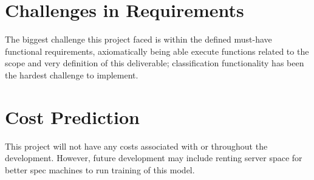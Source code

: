 \section{Challenges in Requirements}

The biggest challenge this project faced is within the defined must-have functional requirements, axiomatically being able execute functions related to the scope and very definition of this deliverable; classification functionality has been the hardest challenge to implement.

\section{Cost Prediction}

This project will not have any costs associated with or throughout the development. However, future development may include renting server space for better spec machines to run training of this model.